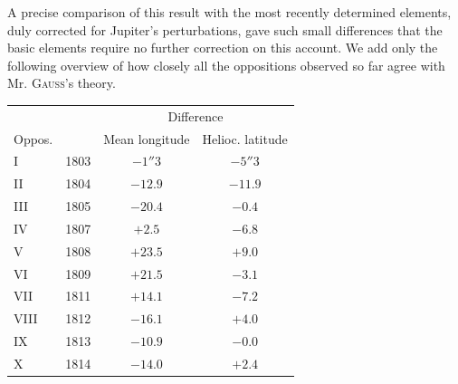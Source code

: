 \par\indent A precise comparison of this result with the most recently determined elements, duly corrected for Jupiter’s perturbations, gave such small differences that the basic elements require no further correction on this account. We add only the following overview of how closely all the oppositions observed so far agree with Mr. \textsc{Gauss}’s theory.

\begin{center}
\fontsize{10}{12}\selectfont\setlength{\tabcolsep}{5pt}\renewcommand{\arraystretch}{1.15}\begin{tabular}{ll|cc}
 & & \multicolumn{2}{c}{Difference} \\
Oppos. & & Mean longitude & Helioc. latitude \\
\hline
I & 1803 & $-1''3$ & $-5''3$ \\
II & 1804 & $-12.9$ & $-11.9$ \\
III & 1805 & $-20.4$ & $-0.4$ \\
IV & 1807 & $+2.5$ & $-6.8$ \\
V & 1808 & $+23.5$ & $+9.0$ \\
VI & 1809 & $+21.5$ & $-3.1$ \\
VII & 1811 & $+14.1$ & $-7.2$ \\
VIII & 1812 & $-16.1$ & $+4.0$ \\
IX & 1813 & $-10.9$ & $-0.0$ \\
X & 1814 & $-14.0$ & $+2.4$ \\
\end{tabular}
\end{center}
